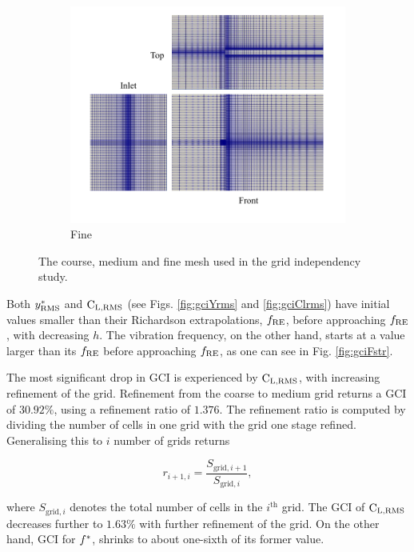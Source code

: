 \documentclass[oneside]{utmthesis}
\begin{document}
\begin{figure} \continuedfloat
  \centering
  \begin{subfigure}[h]{0.85\textwidth}
    \includegraphics[width=\textwidth]{figs/figure6c}
    \caption{Fine}
    \label{fig:fineMesh}
  \end{subfigure}

  \caption{The course, medium and fine mesh used in the grid independency study.} \label{fig:convergenceStudy}
\end{figure}

\noindent Both $y^{*}_{\text{RMS}}$ and $\text{C}_{\text{L,RMS}}$ (see Figs. \ref{fig:gciYrms} and \ref{fig:gciClrms}) have initial values smaller than their Richardson extrapolations, $f_{\text{RE}}$, before approaching $f_{\text{RE}}$, with decreasing $h$. The vibration frequency, on the other hand, starts at a value larger than its $f_{\text{RE}}$ before approaching $f_{\text{RE}}$, as one can see in Fig. \ref{fig:gciFstr}.

The most significant drop in GCI is experienced by $\text{C}_{\text{L,RMS}}$, with increasing refinement of the grid. Refinement from the coarse to medium grid returns a GCI of $30.92\%$, using a refinement ratio of $1.376$. The refinement ratio is computed by dividing the number of cells in one grid with the grid one stage refined. Generalising this to $i$ number of grids returns

\begin{equation}
  r_{i+1,i} = \frac{S_{\text{grid},i+1}}{S_{\text{grid},i}},
  \label{eq:refinementRatio}
\end{equation}

\noindent where $S_{\text{grid},i}$ denotes the total number of cells in the $i^{\text{th}}$ grid. The GCI of $\text{C}_{\text{L,RMS}}$ decreases further to $1.63\%$ with further refinement of the grid. On the other hand, GCI for $f^{*}$, shrinks to about one-sixth of its former value.
\end{document}
